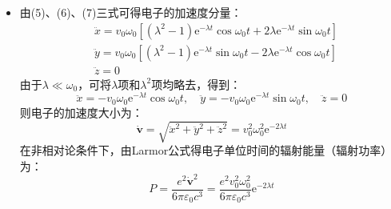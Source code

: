 \documentclass[a4paper,fontset=none]{ctexart}
\begin{document}
\begin{itemize}
    \item[6.(2)]
    由(5)、(6)、(7)三式可得电子的加速度分量：
    \begin{align}
        &\ddot{x} = v_0\omega_0\left[(\lambda^2-1)\mathrm{e}^{-\lambda t}\cos\omega_0t + 2\lambda\mathrm{e}^{-\lambda t}\sin\omega_0t\right] \\
        &\ddot{y} = v_0\omega_0\left[(\lambda^2-1)\mathrm{e}^{-\lambda t}\sin\omega_0t - 2\lambda\mathrm{e}^{-\lambda t}\cos\omega_0t\right] \\
        &\ddot{z} = 0
    \end{align}
    由于$\lambda\ll\omega_0$，可将$\lambda$项和$\lambda^2$项均略去，得到：
    \[
        \ddot{x} = -v_0\omega_0\mathrm{e}^{-\lambda t}\cos\omega_0t,\quad \ddot{y} = -v_0\omega_0\mathrm{e}^{-\lambda t}\sin\omega_0t,\quad \ddot{z} = 0
    \]
    则电子的加速度大小为：
    \[
        \dot{\bm{v}} = \sqrt{\ddot{x}^2 + \ddot{y}^2 + \ddot{z}^2} = v_0^2\omega_0^2\mathrm{e}^{-2\lambda t}
    \]
    在非相对论条件下，由Larmor公式得电子单位时间的辐射能量（辐射功率）为：
    \[
        P = \frac{e^2\dot{\bm{v}}^2}{6\pi\varepsilon_0c^3} = \frac{e^2v_0^2\omega_0^2}{6\pi\varepsilon_0c^3}\mathrm{e}^{-2\lambda t}
    \]


\end{itemize}
\end{document}
